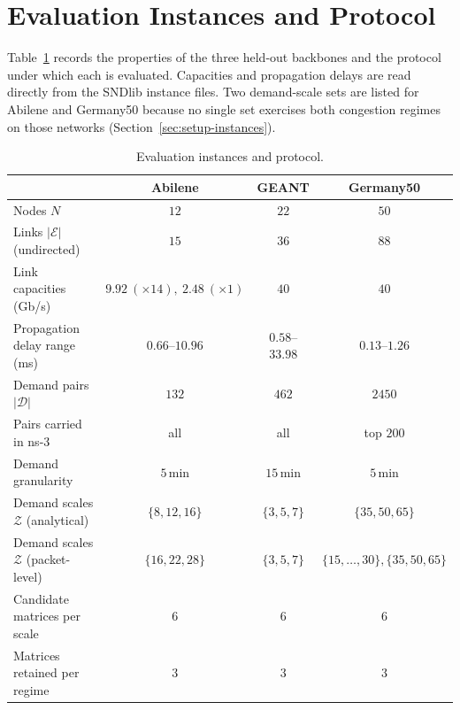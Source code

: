 \appendix

\section{Evaluation Instances and Protocol}
\label{app:instances}

Table~\ref{tab:eval-setup} records the properties of the three held-out backbones
and the protocol under which each is evaluated. Capacities and propagation delays
are read directly from the SNDlib instance files. Two demand-scale sets are listed
for Abilene and Germany50 because no single set exercises both congestion regimes
on those networks (Section~\ref{sec:setup-instances}).

\begin{table}[h]
\centering
\small
\begin{tabular}{lccc}
\hline
& Abilene & GEANT & Germany50 \\
\hline
Nodes $N$ & $12$ & $22$ & $50$ \\
Links $|\mathcal{E}|$ (undirected) & $15$ & $36$ & $88$ \\
Link capacities (Gb/s) & $9.92\ (\times 14),\ 2.48\ (\times 1)$ & $40$ & $40$ \\
Propagation delay range (ms) & $0.66$--$10.96$ & $0.58$--$33.98$ & $0.13$--$1.26$ \\
Demand pairs $|\mathcal{D}|$ & $132$ & $462$ & $2450$ \\
Pairs carried in ns-3 & all & all & top $200$ \\
Demand granularity & $5$\,min & $15$\,min & $5$\,min \\
\hline
Demand scales $\mathcal{Z}$ (analytical) & $\{8,12,16\}$ & $\{3,5,7\}$ & $\{35,50,65\}$ \\
Demand scales $\mathcal{Z}$ (packet-level) & $\{16,22,28\}$ & $\{3,5,7\}$ & $\{15,\dots,30\},\{35,50,65\}$ \\
Candidate matrices per scale & $6$ & $6$ & $6$ \\
Matrices retained per regime & $3$ & $3$ & $3$ \\
\hline
\end{tabular}
\caption{Evaluation instances and protocol.}
\label{tab:eval-setup}
\end{table}
